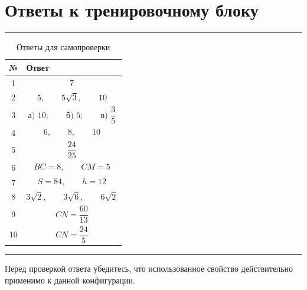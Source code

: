 \documentclass[a4paper,12pt]{article}
\newcommand{\sectionrule}{%
  \par\vspace{-0.35em}%
  {\color{accent!60}\rule{\linewidth}{0.7pt}}%
  \vspace{0.35em}
}
\begin{document}
\clearpage
\section*{\textcolor{darkaccent}{Ответы к тренировочному блоку}}
\sectionrule

\begin{table}[ht]
\centering
\caption{Ответы для самопроверки}
\renewcommand{\arraystretch}{1.45}
\begin{tabularx}{\linewidth}{@{}cX@{}}
\toprule
\textbf{№} & \textbf{Ответ} \\
\midrule

1 &
\[
7
\]
\\

2 &
\[
5,\qquad5\sqrt3,\qquad10
\]
\\

3 &
\[
\text{а) }10;
\qquad
\text{б) }5;
\qquad
\text{в) }\frac35
\]
\\

4 &
\[
6,\qquad8,\qquad10
\]
\\

5 &
\[
\frac{24}{25}
\]
\\

6 &
\[
BC=8,\qquad CM=5
\]
\\

7 &
\[
S=84,\qquad h=12
\]
\\

8 &
\[
3\sqrt2,\qquad3\sqrt6,\qquad6\sqrt2
\]
\\

9 &
\[
CN=\frac{60}{13}
\]
\\

10 &
\[
CN=\frac{24}{5}
\]
\\

\bottomrule
\end{tabularx}
\end{table}

\vfill

\begin{center}
{\color{accent!65}\rule{0.62\linewidth}{0.8pt}}

\vspace{0.5em}

\small
Перед проверкой ответа убедитесь, что использованное свойство
действительно применимо к данной конфигурации.
\end{center}
\end{document}

